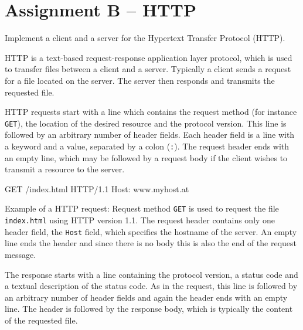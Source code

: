 



\section*{Assignment B -- HTTP}
\label{sec:intro}

Implement a client and a server for the Hypertext Transfer Protocol (HTTP).

HTTP is a text-based request-response application layer protocol,
which is used to transfer files between a client and a server.
Typically a client sends a request for a file located on the server.
The server then responds and transmits the requested file.

HTTP requests start with a line which contains
the request method (for instance \verb|GET|),
the location of the desired resource and the protocol version.
This line is followed by an arbitrary number of header fields.
Each header field is a line with a keyword and a value,
separated by a colon (\verb|:|).
The request header ends with an empty line,
which may be followed by a request body
if the client wishes to transmit a resource to the server.

\begin{center}
\begin{minipage}{8cm}
\begin{osuefmtcode}
GET /index.html HTTP/1.1
Host: www.myhost.at
\end{osuefmtcode}
\end{minipage}
\begin{minipage}{12cm}
\vspace{3mm}
\footnotesize{Example of a HTTP request:
Request method \verb|GET| is used to request the file \verb|index.html|
using HTTP version 1.1.
The request header contains only one header field,
the \verb|Host| field, which specifies the hostname of the server.
An empty line ends the header
and since there is no body this is also the end of the request message.}
\end{minipage}
\end{center}

The response starts with a line containing the protocol version,
a status code and a textual description of the status code.
As in the request,
this line is followed by an arbitrary number of header fields
and again the header ends with an empty line.
The header is followed by the response body,
which is typically the content of the requested file.

